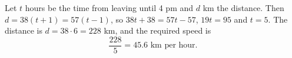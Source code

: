 Let $t$ hours be the time from leaving until 4 pm and $d$ km the distance. Then $d=38(t+1)=57(t-1)$, so $38t+38=57t-57$, $19t=95$ and $t=5$. The distance is $d=38\cdot6=228$ km, and the required speed is
\[
\dfrac{228}{5}=\boxed{45.6\text{ km per hour}}.
\]
